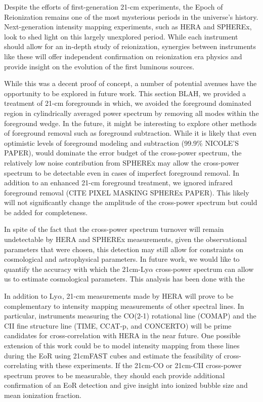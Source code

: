 Despite the efforts of first-generation 21-cm experiments, the Epoch of Reionization
remains one of the most mysterious periods in the universe's history. Next-generation
intensity mapping experiments, such as HERA and SPHEREx, look to shed light on
this largely unexplored period. While each instrument should allow for an in-depth study
of reionization, synergies between instruments like these will offer independent
confirmation on reionization era physics and provide insight on the evolution of
the first luminous sources.

While this was a decent proof of concept, a number of potential avenues have the
opportunity to be explored in future work. This section BLAH, we provided a treatment
of 21-cm foregrounds in which, we avoided the foreground dominated region in
cylindrically averaged power spectrum by removing all modes within the foreground
wedge. In the future, it might be interesting to explore other methods of foreground
removal such as foreground subtraction. While it is likely that even optimistic
levels of foreground modeling and subtraction (99.9\% NICOLE'S PAPER), would dominate the error
budget of the cross-power spectrum, the relatively low noise contribution from SPHEREx
may allow the cross-power spectrum to be detectable even in cases of imperfect foreground
removal. In addition to an enhanced 21-cm foreground treatment, we ignored infrared foreground
removal (CITE PIXEL MASKING SPHEREx PAPER). This likely will not significantly
change the amplitude of the cross-power spectrum but could be added for completeness.

In spite of the fact that the cross-power spectrum turnover will remain undetectable
by HERA and SPHEREx measurements, given the observational parameters that were chosen, this
detection may still allow for constraints on cosmological and astrophysical parameters.
In future work, we would like to quantify the accuracy with which the 21cm-Ly$\alpha$
cross-power spectrum can allow us to estimate cosmological parameters. This analysis
has been done with the

In addition to Ly$\alpha$, 21-cm measurements made by HERA will prove to be
complementary to intensity mapping measurements of other spectral lines. In particular,
instruments measuring the CO(2-1) rotational line (COMAP) and the CII fine
structure line (TIME, CCAT-p, and CONCERTO) will be prime candidates for cross-correlation
with HERA in the near future. One possible extension of this work could be to model
intensity mapping from these lines during the EoR using 21cmFAST cubes and estimate the feasibility
of cross-correlating with these experiments. If the 21cm-CO or 21cm-CII cross-power
spectrum proves to be measurable, they should each provide additional confirmation
of an EoR detection and give insight into ionized bubble size and mean ionization fraction.

